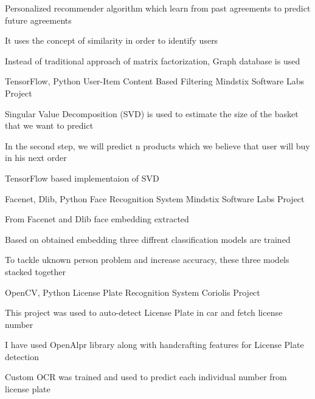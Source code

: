 \begin{cventries}
    {
      \begin{cvitems} %
        \item {Personalized recommender algorithm which learn from past agreements to predict future agreements}
        \item {It uses the concept of similarity in order to identify users}
        \item {Instead of traditional approach of matrix factorization, Graph database is used}
      \end{cvitems}
    }
  \cventry
    {TensorFlow, Python} %
    {User-Item Content Based Filtering} %
    {Mindstix Software Labs Project} %
    {} %
    {
      \begin{cvitems} %
        \item {Singular Value Decomposition (SVD) is used to estimate the size of the basket that we want to predict}
        \item {In the second step, we will predict n products which we believe that user will buy in his next order}
        \item {TensorFlow based implementaion of SVD}
      \end{cvitems}
    }
  \cventry
    {Facenet, Dlib, Python} %
    {Face Recognition System} %
    {Mindstix Software Labs Project} %
    {} %
    {
      \begin{cvitems} %
        \item {From Facenet and Dlib face embedding extracted}
        \item {Based on obtained embedding three diffrent classification models are trained }
        \item {To tackle uknown person problem and increase accuracy, these three models stacked together}
      \end{cvitems}
    }
  \cventry
    {OpenCV, Python} %
    {License Plate Recognition System} %
    {Coriolis Project} %
    {} %
    {
      \begin{cvitems} %
        \item {This project was used to auto-detect License Plate in car and fetch license number}
        \item {I have used OpenAlpr library along with handcrafting features for License Plate detection}
        \item {Custom OCR was trained and used to predict each individual number from license plate}
      \end{cvitems}
    }


\end{cventries}
